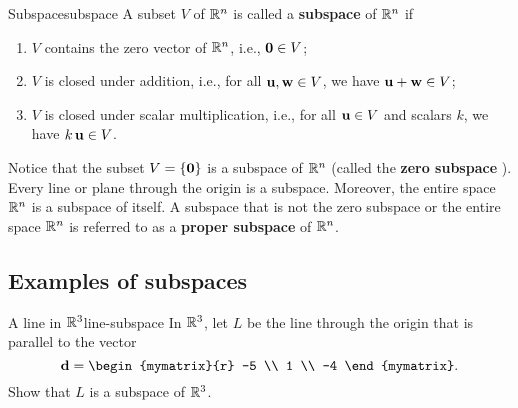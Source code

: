\begin{definition}{Subspace}{subspace}
  A subset $V$ of $\mathbb{R}^n$ is called a \textbf{subspace}%
   of $\mathbb{R}^n$ if
  \begin{enumerate}
  \item $V$ contains the zero vector of $\mathbb{R}^n$, i.e., $\mbox{\bf 0}\in V$;
  \item $V$ is closed under addition, i.e., for all\/
    $\mbox{\bf u},\mbox{\bf w}\in V$, we have $\mbox{\bf u}+\mbox{\bf w}\in V$;
  \item $V$ is closed under scalar multiplication, i.e., for all\/
    $\mbox{\bf u}\in V$ and scalars $k$, we have\/ $k\,\mbox{\bf u}\in V$.
  \end{enumerate}
\end{definition}

Notice that the subset $V = \left\{\mbox{\bf 0}\right\}$ is a subspace of $\mathbb{R}^n$
(called the \textbf{zero subspace}%
). Every line or plane through the
origin is a subspace. Moreover, the entire space $\mathbb{R}^n$ is a subspace
of itself. A subspace that is not the zero subspace or the entire
space $\mathbb{R}^n$ is referred to as a \textbf{proper subspace}%
 of $\mathbb{R}^n$.

\subsection{Examples of subspaces}

\begin{example}{A line in $\mathbb{R}^3$}{line-subspace}
  In $\mathbb{R}^3$, let $L$ be the line through the origin that is
  parallel to the vector
  \begin{equation*}
    {\vect{d}}= \begin{mymatrix}{r} -5 \\ 1 \\ -4 \end{mymatrix}.
  \end{equation*}
  Show that $L$ is a subspace of $\mathbb{R}^3$.
\end{example}

